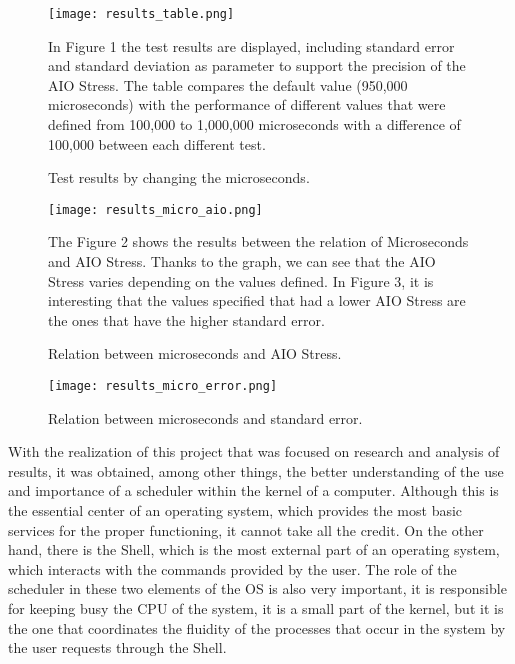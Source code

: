 \documentclass[english]{article}
\begin{document}
\begin{figure}
\texttt{[image: results\_table.png]}
\caption{\label{fig:results_table}  Test results by changing the microseconds.}

In Figure 1 the test results are displayed, including standard error and standard deviation as parameter to support the precision of the AIO Stress. The table compares the default value (950,000 microseconds) with the performance of different values that were defined from 100,000 to 1,000,000 microseconds with a difference of 100,000 between each different test.
\end{figure}

\begin{figure}
\texttt{[image: results\_micro\_aio.png]}
\caption{\label{fig:results_micro_aio} Relation between microseconds and AIO Stress. }
The Figure 2 shows the results between the relation of Microseconds and AIO Stress. Thanks to the graph, we can see that the AIO Stress varies depending on the values defined. In Figure 3, it is interesting that the values specified that had a lower AIO Stress are the ones that have the higher standard error.
\end{figure}


\begin{figure}
\texttt{[image: results\_micro\_error.png]}
\caption{\label{fig:results_micro_error} Relation between microseconds and standard error. }
\end{figure}


\begin{center}
\vspace{28cm}{\bf Conclusion}
\end{center}

	With the realization of this project that was focused on research and analysis of results, it was obtained, among other things, the better understanding of the use and importance of a scheduler within the kernel of a computer. Although this is the essential center of an operating system, which provides the most basic services for the proper functioning, it cannot take all the credit. On the other hand, there is the Shell, which is the most external part of an operating system, which interacts with the commands provided by the user. The role of the scheduler in these two elements of the OS is also very important, it is responsible for keeping busy the CPU of the system, it is a small part of the kernel, but it is the one that coordinates the fluidity of the processes that occur in the system by the user requests through the Shell.
\end{document}
